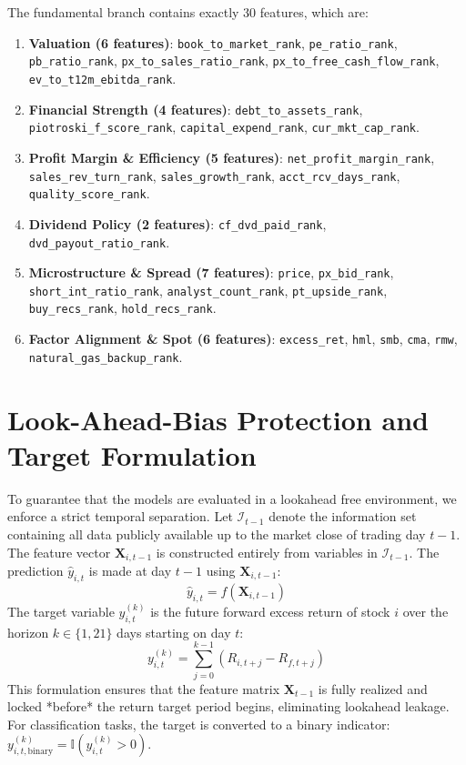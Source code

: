 \documentclass[11pt]{article}
\begin{document}
The fundamental branch contains exactly 30 features, which are:
\begin{enumerate}
    \item \textbf{Valuation (6 features)}: \texttt{book\_to\_market\_rank}, \texttt{pe\_ratio\_rank}, \texttt{pb\_ratio\_rank}, \texttt{px\_to\_sales\_ratio\_rank}, \texttt{px\_to\_free\_cash\_flow\_rank}, \texttt{ev\_to\_t12m\_ebitda\_rank}.
    \item \textbf{Financial Strength (4 features)}: \texttt{debt\_to\_assets\_rank}, \texttt{piotroski\_f\_score\_rank}, \texttt{capital\_expend\_rank}, \texttt{cur\_mkt\_cap\_rank}.
    \item \textbf{Profit Margin \& Efficiency (5 features)}: \texttt{net\_profit\_margin\_rank}, \texttt{sales\_rev\_turn\_rank}, \texttt{sales\_growth\_rank}, \texttt{acct\_rcv\_days\_rank}, \texttt{quality\_score\_rank}.
    \item \textbf{Dividend Policy (2 features)}: \texttt{cf\_dvd\_paid\_rank}, \texttt{dvd\_payout\_ratio\_rank}.
    \item \textbf{Microstructure \& Spread (7 features)}: \texttt{price}, \texttt{px\_bid\_rank}, \texttt{short\_int\_ratio\_rank}, \texttt{analyst\_count\_rank}, \texttt{pt\_upside\_rank}, \texttt{buy\_recs\_rank}, \texttt{hold\_recs\_rank}.
    \item \textbf{Factor Alignment \& Spot (6 features)}: \texttt{excess\_ret}, \texttt{hml}, \texttt{smb}, \texttt{cma}, \texttt{rmw}, \texttt{natural\_gas\_backup\_rank}.
\end{enumerate}

\section{Look-Ahead-Bias Protection and Target Formulation}
To guarantee that the models are evaluated in a lookahead free environment, we enforce a strict temporal separation. 
Let $\mathcal{I}_{t-1}$ denote the information set containing all data publicly available up to the market close of trading day $t-1$. The feature vector $\mathbf{X}_{i,t-1}$ is constructed entirely from variables in $\mathcal{I}_{t-1}$. 
The prediction $\hat{y}_{i,t}$ is made at day $t-1$ using $\mathbf{X}_{i,t-1}$:
\begin{equation}
    \hat{y}_{i,t} = f(\mathbf{X}_{i,t-1})
\end{equation}
The target variable $y_{i,t}^{(k)}$ is the future forward excess return of stock $i$ over the horizon $k \in \{1, 21\}$ days starting on day $t$:
\begin{equation}
    y_{i,t}^{(k)} = \sum_{j=0}^{k-1} \left( R_{i,t+j} - R_{f,t+j} \right)
\end{equation}
This formulation ensures that the feature matrix $\mathbf{X}_{t-1}$ is fully realized and locked *before* the return target period begins, eliminating lookahead leakage. For classification tasks, the target is converted to a binary indicator: $y_{i,t,\text{binary}}^{(k)} = \mathbb{I}(y_{i,t}^{(k)} > 0)$.
\end{document}
